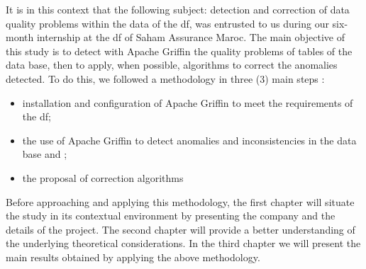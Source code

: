 It is in this context that the following subject: detection and correction of data quality problems within the data of the \acrlong{df}, was entrusted to us during our six-month internship at the \acrlong{df} of Saham Assurance Maroc. The main objective of this study is to detect with Apache Griffin the quality problems of tables of the data base, then to apply, when possible, algorithms to correct the anomalies detected. To do this, we followed a methodology in three (3) main steps :
\begin{itemize}[parsep=0cm,itemsep=0cm]
    \item installation and configuration of Apache Griffin to meet the requirements of the \acrlong{df};
    \item the use of Apache Griffin to detect anomalies and inconsistencies in the data base and ;
    \item the proposal of correction algorithms
\end{itemize}

Before approaching and applying this methodology, the first chapter will situate the study in its contextual environment by presenting the company and the details of the project. The second chapter will provide a better understanding of the underlying theoretical considerations. In the third chapter we will present the main results obtained by applying the above methodology.


